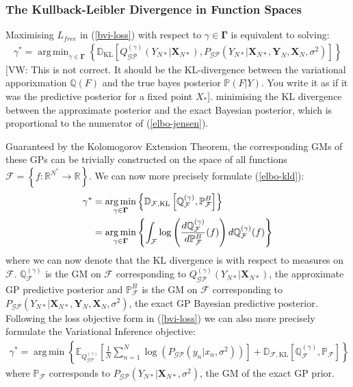 \documentclass{article}
\newcommand{\vw}[1]{{\color{green} [VW: #1]}}
\newcommand{\KLD}{\operatorname{\mathbb{D}_{\text{KL}}}}
\newcommand{\GP}{\operatorname{\mathcal{GP}}}
\DeclareMathOperator*{\argmin}{arg\,min}
\numberwithin{equation}{section}
\begin{document}
\subsubsection{The Kullback-Leibler Divergence in Function Spaces}
Maximising $L_{free}$ in (\ref{bvi-loss}) with respect to $\gamma \in \mathbf{\Gamma}$ is equivalent to solving:
\begin{align}
    \gamma^* = \argmin_{\gamma \in \mathbf{\Gamma}} \left\{\KLD \left[ Q_{\GP}^{(\gamma)}\left(Y_{N*} \vert \mathbf{X}_{N*}\right) ,  P_{\GP}\left(Y_{N*} \vert \mathbf{X}_{N*}, \mathbf{Y}_N, \mathbf{X}_N, \sigma^2 \right) \right]\right\}
    \label{elbo-kld}
\end{align}
\vw{This is not correct. It should be the KL-divergence between the variational apporixmation $\mathbb{Q}(F)$ and the true bayes posterior $\mathbb{P}(F|Y)$. You write it as if it was the predictive posterior for a fixed point $X_*$}.
minimising the KL divergence between the approximate posterior and the exact Bayesian posterior, which is proportional to the numerator of (\ref{elbo-jensen}). 

Guaranteed by the Kolomogorov Extension Theorem, the corresponding GMs of these GPs can be trivially constructed on the space of all functions $\mathcal{F} = \left\{f: \mathbb{R}^{N^*} \rightarrow \mathbb{R} \right\}$. We can now more precisely formulate (\ref{elbo-kld}):
\begin{align}
    \label{kld-function-spaces}
    \gamma^* &=\argmin_{\gamma \in \mathbf{\Gamma}}  \left\{ \mathbb{D}_{\mathcal{F}, \text{\text{KL}}}\left[ \mathbb{Q}^{(\gamma)}_\mathcal{F},  \mathbb{P}^B_\mathcal{F}\right] \right\} \\
    &= \argmin_{\gamma \in \mathbf{\Gamma}} \left\{\int_{\mathcal{F}} \log \left( \frac{d \mathbb{Q}^{(\gamma)}_\mathcal{F}}{d \mathbb{P}^B_\mathcal{F}} (f)\right)d \mathbb{Q}^{(\gamma)}_\mathcal{F}(f) \right\}
    \label{radon-nikodym}
\end{align}
where we can now denote that the KL divergence is with respect to measures on $\mathcal{F}$. $\mathbb{Q}^{(\gamma)}_\mathcal{F}$ is the GM on $\mathcal{F}$ corresponding to $Q_{\GP}^{(\gamma)}\left(Y_{N*} \vert \mathbf{X}_{N*}\right)$, the approximate GP predictive posterior and $\mathbb{P}^B_\mathcal{F}$ is the GM on $\mathcal{F}$ corresponding to $P_{\GP}\left(Y_{N*} \vert \mathbf{X}_{N*}, \mathbf{Y}_N, \mathbf{X}_N, \sigma^2 \right)$, the exact GP Bayesian predictive posterior. Following the loss objective form in (\ref{bvi-loss}) we can also more precisely formulate the Variational Inference objective:
\begin{align}
    \gamma^* = \argmin \left\{ \mathbb{E}_{Q^{(\gamma)}_{\GP}}\left[\frac{1}{N}\sum_{n=1}^N\log \left(P_{\GP}\left(y_n \vert x_n, \sigma^2\right)\right)\right] + \mathbb{D}_{\mathcal{F}, \text{KL}} \left[\mathbb{Q}^{(\gamma)}_{\mathcal{F}}, \mathbb{P}_{\mathcal{F}} \right] \right\}
    \label{bvi-gm-loss}
\end{align}
where $\mathbb{P}_\mathcal{F}$ corresponds to $P_{\GP}\left(Y_{N*} \vert \mathbf{X}_{N*}, \sigma^2 \right)$, the GM of the exact GP prior.
\end{document}
